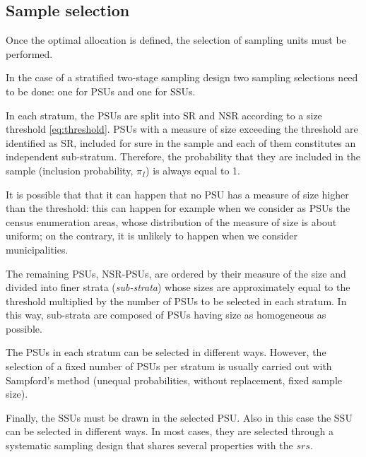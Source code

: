 \subsection{Sample selection}
\label{sec:samplesel}
Once the optimal allocation is defined, the selection of sampling units must be performed.

In the case of a stratified two-stage sampling design two sampling selections need to be done: one for PSUs and one for SSUs.

In each stratum, the PSUs are split into SR and NSR according to a size threshold \eqref{eq:threshold}. 
PSUs with a measure of size exceeding the threshold are identified as SR, included for sure in the sample and each of them constitutes an independent sub-stratum. 
Therefore, the probability that they are included in the sample (inclusion probability,  $\pi_I$) is always equal to 1.

It is possible that that it can happen that no PSU has a measure of size higher than the threshold: this can happen for example when we consider as PSUs the census enumeration areas, whose distribution of the measure of size is about uniform; on the contrary, it is unlikely to happen when we consider municipalities. 

The remaining PSUs, NSR-PSUs, are ordered by their measure of the size and divided into finer strata (\textit{sub-strata}) whose sizes are approximately equal to the threshold multiplied by the number of PSUs to be selected in each stratum.
In this way, sub-strata are composed of PSUs having size as homogeneous as possible. 

The PSUs in each stratum can be selected in different ways.
However, the selection of a fixed number of PSUs per stratum is usually carried out with Sampford's method (unequal probabilities, without replacement, fixed sample size).

Finally, the SSUs must be drawn in the selected PSU.
Also in this case the SSU can be selected in different ways.
In most cases, they are selected through a systematic sampling design that shares several properties with the $srs$.

